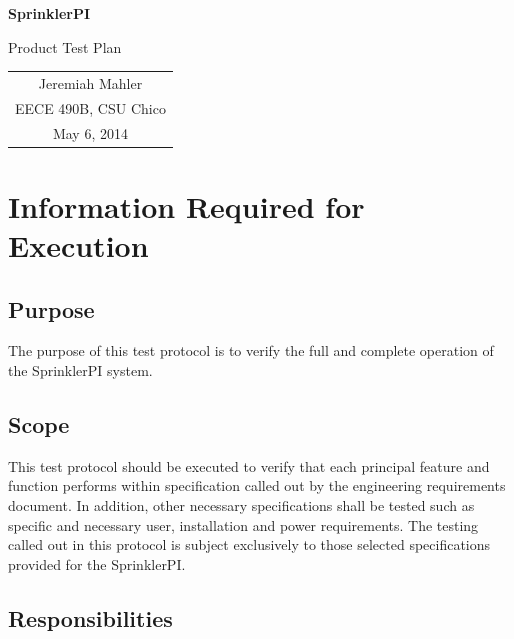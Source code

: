 \documentclass{article}
\begin{document}
\vspace*{1.0in}

\centerline{\LARGE \textbf{SprinklerPI}}
\vspace{0.3in}
\centerline{\LARGE Product Test Plan}

\vfill

\begin{center}
\begin{tabular}{c}
Jeremiah Mahler \\
EECE 490B, CSU Chico \\
May 6, 2014
\end{tabular}
\end{center}

\vspace{2in}

\thispagestyle{empty}


\pagebreak

\thispagestyle{empty}
\tableofcontents
\clearpage

\section{Information Required for Execution}

\subsection{Purpose}

The purpose of this test protocol is to verify the full and complete
operation of the SprinklerPI system.

\subsection{Scope}

This test protocol should be executed to verify that each principal feature
and function performs within specification called out by the engineering
requirements document. In addition, other necessary specifications shall
be tested such as specific and necessary user, installation and power
requirements. The testing called out in this protocol is subject exclusively
to those selected specifications provided for the SprinklerPI.

\subsection{Responsibilities}
\end{document}
